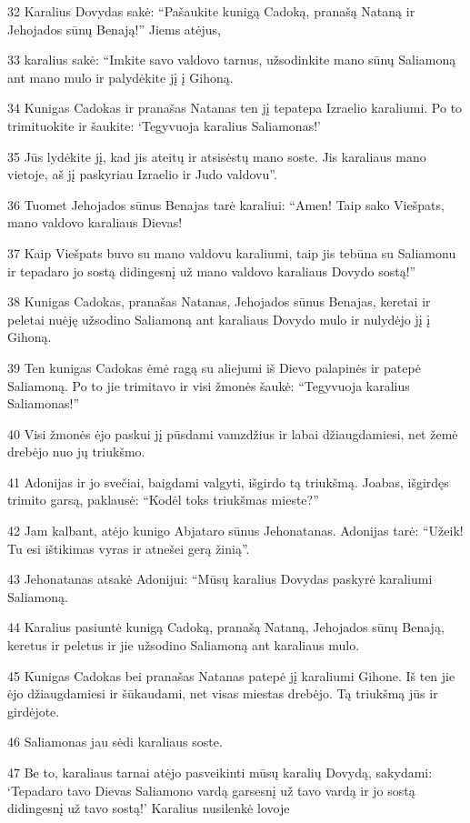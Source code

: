 \par 32 Karalius Dovydas sakė: “Pašaukite kunigą Cadoką, pranašą Nataną ir Jehojados sūnų Benają!” Jiems atėjus, 
\par 33 karalius sakė: “Imkite savo valdovo tarnus, užsodinkite mano sūnų Saliamoną ant mano mulo ir palydėkite jį į Gihoną. 
\par 34 Kunigas Cadokas ir pranašas Natanas ten jį tepatepa Izraelio karaliumi. Po to trimituokite ir šaukite: ‘Tegyvuoja karalius Saliamonas!’ 
\par 35 Jūs lydėkite jį, kad jis ateitų ir atsisėstų mano soste. Jis karaliaus mano vietoje, aš jį paskyriau Izraelio ir Judo valdovu”. 
\par 36 Tuomet Jehojados sūnus Benajas tarė karaliui: “Amen! Taip sako Viešpats, mano valdovo karaliaus Dievas! 
\par 37 Kaip Viešpats buvo su mano valdovu karaliumi, taip jis tebūna su Saliamonu ir tepadaro jo sostą didingesnį už mano valdovo karaliaus Dovydo sostą!” 
\par 38 Kunigas Cadokas, pranašas Natanas, Jehojados sūnus Benajas, keretai ir peletai nuėję užsodino Saliamoną ant karaliaus Dovydo mulo ir nulydėjo jį į Gihoną. 
\par 39 Ten kunigas Cadokas ėmė ragą su aliejumi iš Dievo palapinės ir patepė Saliamoną. Po to jie trimitavo ir visi žmonės šaukė: “Tegyvuoja karalius Saliamonas!” 
\par 40 Visi žmonės ėjo paskui jį pūsdami vamzdžius ir labai džiaugdamiesi, net žemė drebėjo nuo jų triukšmo. 
\par 41 Adonijas ir jo svečiai, baigdami valgyti, išgirdo tą triukšmą. Joabas, išgirdęs trimito garsą, paklausė: “Kodėl toks triukšmas mieste?” 
\par 42 Jam kalbant, atėjo kunigo Abjataro sūnus Jehonatanas. Adonijas tarė: “Užeik! Tu esi ištikimas vyras ir atnešei gerą žinią”. 
\par 43 Jehonatanas atsakė Adonijui: “Mūsų karalius Dovydas paskyrė karaliumi Saliamoną. 
\par 44 Karalius pasiuntė kunigą Cadoką, pranašą Nataną, Jehojados sūnų Benają, keretus ir peletus ir jie užsodino Saliamoną ant karaliaus mulo. 
\par 45 Kunigas Cadokas bei pranašas Natanas patepė jį karaliumi Gihone. Iš ten jie ėjo džiaugdamiesi ir šūkaudami, net visas miestas drebėjo. Tą triukšmą jūs ir girdėjote. 
\par 46 Saliamonas jau sėdi karaliaus soste. 
\par 47 Be to, karaliaus tarnai atėjo pasveikinti mūsų karalių Dovydą, sakydami: ‘Tepadaro tavo Dievas Saliamono vardą garsesnį už tavo vardą ir jo sostą didingesnį už tavo sostą!’ Karalius nusilenkė lovoje 
